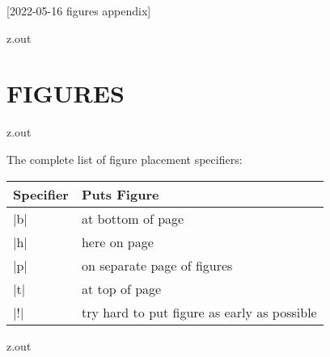[2022-05-16 figures appendix]

\begin{VerbatimOut}{z.out}
\chapter{FIGURES}
\end{VerbatimOut}

\MyIO



\MyIO


\begin{VerbatimOut}{z.out}

The complete list of figure placement specifiers:

\begin{inlinetable}
  \begin{tabular}{@{}ll@{}}
    \toprule
    \textbf{Specifier}& \textbf{Puts Figure}\\
    \midrule
    |b|& at bottom of page\\
    |h|& here on page\\
    |p|& on separate page of figures\\
    |t|& at top of page\\
    |!|& try hard to put figure as early as possible\\
    \bottomrule
  \end{tabular}
  \index{\verb+\begin{tabular}+}
\end{inlinetable}
\end{VerbatimOut}

\MyIO



\begin{VerbatimOut}{z.out}

\end{VerbatimOut}

